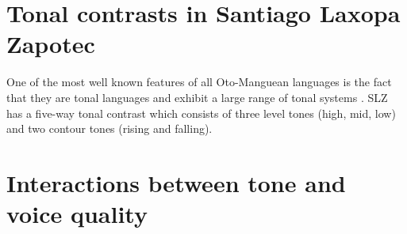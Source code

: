 \section{Tonal contrasts in Santiago Laxopa Zapotec} \label{sec:SLZ-tones}
One of the most well known features of all Oto-Manguean languages is the fact that they are tonal languages and exhibit a large range of tonal systems \citep{pikeProblemsZapotecTone1948,renschComparativeOtomangueanPhonology1976,josserandMixtecDialectHistory1983,silvermanLaryngealComplexityOtomanguean1997,beamdeazconaProblemsZapotecTone2007,dicanioItunyosoTrique2010,dicanioCoarticulationToneGlottal2012,elliottChicahuaxtlaTriqui2016,campbellOtomangueanHistoricalLinguistics2017,campbellOtomangueanHistoricalLinguistics2017a,lillehaugenOtomangueanLanguages2019,eischensTonePhonationPhonologyPhonetics2022}. SLZ has a five-way tonal contrast which consists of three level tones (high, mid, low) and two contour tones (rising and falling). 

\citet{brinkerhoffTonalPatternsTheir2022}

\section{Interactions between tone and voice quality} \label{sec:SLZ-interaction}


